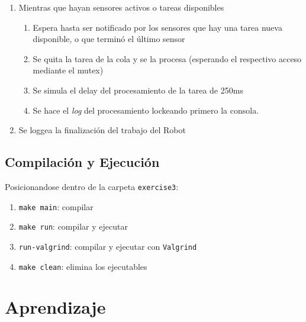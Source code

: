 \documentclass[11pt, a4paper]{article}
\begin{document}
\begin{multicols}{2}
\begin{enumerate}[label=\Roman*.]
    \item Mientras que hayan sensores activos o tareas disponibles
    \begin{enumerate}[label=\roman*.]
        \item Espera hasta ser notificado por los sensores que hay una tarea nueva disponible,
        o que terminó el último sensor
        \item Se quita la tarea de la cola y se la procesa (esperando el respectivo acceso mediante
        el mutex)
        \item Se simula el delay del procesamiento de la tarea de 250ms
        \item Se hace el \textit{log} del procesamiento lockeando primero la consola.
    \end{enumerate}
    \item Se loggea la finalización del trabajo del Robot
\end{enumerate}

\subsection{Compilación y Ejecución}

Posicionandose dentro de la carpeta \lstinline|exercise3|:

\begin{enumerate}[label=\roman*.]
    \item \lstinline|make main|: compilar
    \item \lstinline|make run|: compilar y ejecutar
    \item \lstinline|run-valgrind|: compilar y ejecutar con \lstinline|Valgrind|
    \item \lstinline|make clean|: elimina los ejecutables 
\end{enumerate}
\section*{Aprendizaje}
\end{multicols}
\end{document}
